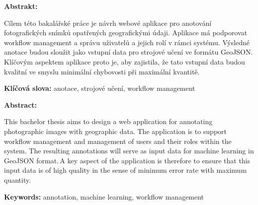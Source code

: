 \textbf{Abstrakt:}

Cílem této bakalářské práce je návrh webové aplikace pro anotování fotografických snímků opatřených geografickými údaji. Aplikace má podporovat workflow management a správu uživatelů a jejich rolí v rámci systému. Výsledné anotace budou sloužit jako vstupní data pro strojové učení ve formátu GeoJSON. Klíčovým aspektem aplikace proto je, aby zajistila, že tato vstupní data budou kvalitní ve smyslu minimální chybovosti při maximální kvantitě.

\textbf{Klíčová slova:} anotace, strojové učení, workflow management

\bigskip


\textsc{\nazeven}

\textbf{Abstract:}

This bachelor thesis aims to design a web application for annotating photographic images with geographic data. The application is to support workflow management and management of users and their roles within the system. The resulting annotations will serve as input data for machine learning in GeoJSON format. A key aspect of the application is therefore to ensure that this input data is of high quality in the sense of minimum error rate with maximum quantity.

\textbf{Keywords:} annotation, machine learning, workflow management